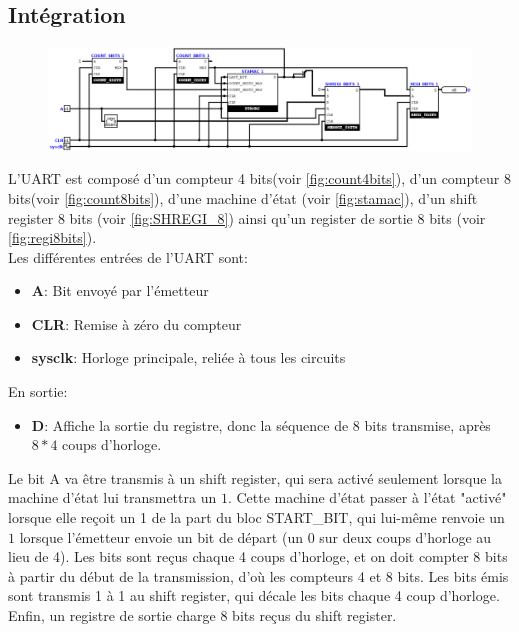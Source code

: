 \documentclass[a4paper]{article} %
\begin{document}
\subsection{Intégration}
\begin{tcolorbox}[colframe=Monokaimagenta,colback=white]
\begin{figure}[H]
\centering
    \includegraphics[width=.8\textwidth]{src/UART.png}
    \label{fig:uart}
\end{figure}

L'UART est composé d'un compteur 4 bits(voir \ref{fig:count4bits}), d'un compteur 8 bits(voir \ref{fig:count8bits}), d'une machine d'état (voir \ref{fig:stamac}), d'un shift register 8 bits (voir \ref{fig:SHREGI_8}) ainsi qu'un register de sortie 8 bits (voir \ref{fig:regi8bits}).\\
Les différentes entrées de l'UART sont:
\begin{itemize}
    \item     \textbf{A}: Bit envoyé par l'émetteur
    \item     \textbf{CLR}: Remise à zéro du compteur
    \item     \textbf{sysclk}: Horloge principale, reliée à tous les circuits
\end{itemize}
En sortie:
\begin{itemize}
    \item     \textbf{D}: Affiche la sortie du registre, donc la séquence de 8 bits transmise, après $8*4$ coups d'horloge.
\end{itemize}
Le bit A va être transmis à un shift register, qui sera activé seulement lorsque la machine d'état lui transmettra un $1$. Cette machine d'état passer à l'état "activé" lorsque elle reçoit un 1 de la part du bloc START\_BIT, qui lui-même renvoie un $1$ lorsque l'émetteur envoie un bit de départ (un $0$ sur deux coups d'horloge au lieu de 4). Les bits sont reçus chaque 4 coups d'horloge, et on doit compter 8 bits à partir du début de la transmission, d'où les compteurs 4 et 8 bits. Les bits émis sont transmis 1 à 1 au shift register, qui décale les bits chaque 4 coup d'horloge. Enfin, un registre de sortie charge 8 bits reçus du shift register.\\

\end{tcolorbox}
\end{document}
